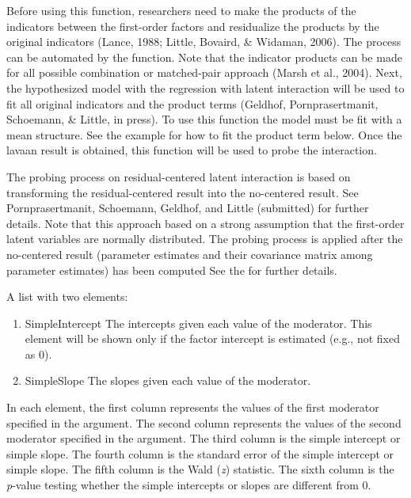 \documentclass[a4paper]{book}
\begin{document}
\begin{Details}\relax
Before using this function, researchers need to make the products of the indicators between the first-order factors and residualize the products by the original indicators (Lance, 1988; Little, Bovaird, \& Widaman, 2006). The process can be automated by the  function. Note that the indicator products can be made for all possible combination or matched-pair approach (Marsh et al., 2004). Next, the hypothesized model with the regression with latent interaction will be used to fit all original indicators and the product terms (Geldhof, Pornprasertmanit,  Schoemann, \& Little, in press). To use this function the model must be fit with a mean structure. See the example for how to fit the product term below. Once the lavaan result is obtained, this function will be used to probe the interaction.

The probing process on residual-centered latent interaction is based on transforming the residual-centered result into the no-centered result. See Pornprasertmanit, Schoemann, Geldhof, and Little (submitted) for further details. Note that this approach based on a strong assumption that the first-order latent variables are normally distributed. The probing process is applied after the no-centered result (parameter estimates and their covariance matrix among parameter estimates) has been computed See the  for further details.
\end{Details}
%
\begin{Value}
A list with two elements:
\begin{enumerate}

\item SimpleIntercept The intercepts given each value of the moderator. This element will be shown only if the factor intercept is estimated (e.g., not fixed as 0).
\item SimpleSlope The slopes given each value of the moderator. 

\end{enumerate}

In each element, the first column represents the values of the first moderator specified in the  argument. The second column represents the values of the second moderator specified in the  argument. The third column is the simple intercept or simple slope. The fourth column is the standard error of the simple intercept or simple slope. The fifth column is the Wald (\emph{z}) statistic. The sixth column is the \emph{p}-value testing whether the simple intercepts or slopes are different from 0.
\end{Value}
\end{document}
